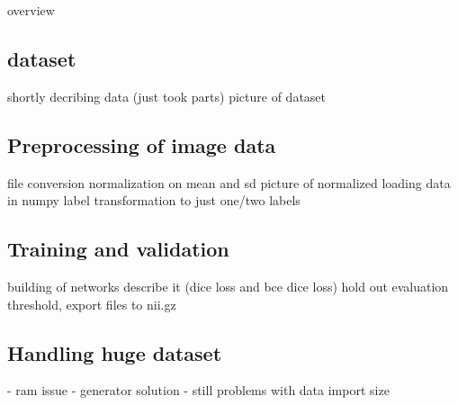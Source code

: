 
overview

\subsection{dataset}
shortly decribing data (just took parts)
picture of dataset

\subsection{Preprocessing of image data}
file conversion
normalization on mean and sd
picture of normalized
loading data in numpy
label transformation to just one/two labels

\subsection{Training and validation}

building of networks
describe it (dice loss and bce dice loss)
hold out evaluation
threshold, export files to nii.gz

\subsection{Handling huge dataset}
- ram issue
- generator solution
- still problems with data import size



